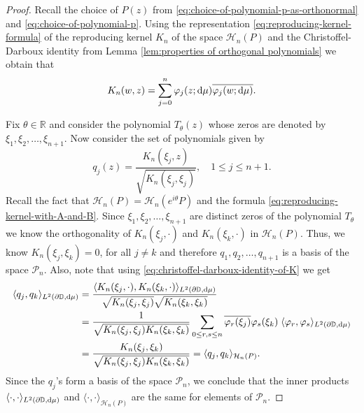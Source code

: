\documentclass[reqno, a4paper]{amsart}
\def\R{\mathbb{R}}
\def\P{\mathcal{P}}
\renewcommand{\d}{\text{\rm d}}
\newcommand{\dD}{\partial\mathbb{D}}
\theoremstyle{plain}
\theoremstyle{definition}
\theoremstyle{remarkstyle}
\numberwithin{equation}{section}
\begin{document}
\begin{proof}
Recall the choice of $P(z)$ from \eqref{eq:choice-of-polynomial-p-as-orthonormal} and \eqref{eq:choice-of-polynomial-p}. Using the representation \eqref{eq:reproducing-kernel-formula} of the reproducing kernel $K_n$ of the space $\mathcal{H}_n(P)$ and the Christoffel-Darboux identity from Lemma \ref{lem:properties of orthogonal polynomials} we obtain that 
\begin{equation}\label{eq:christoffel-darboux-identity-of-K}
    K_n(w, z)=\sum_{j=0}^n \varphi_j(z;\d\mu)\overline{\varphi_j(w; \d\mu)}.
\end{equation}

Fix $\theta\in \R$ and consider the polynomial $T_\theta(z)$ whose zeros are denoted by $\xi_1, \xi_2, \ldots, \xi_{n+1}$. Now consider the set of polynomials given by 
\begin{equation*}
    q_j(z)=\frac{K_n(\xi_j, z)}{\sqrt{K_n(\xi_j, \xi_j)}}, \quad 1\leq j\leq n+1.
\end{equation*} 
Recall the fact that $\mathcal{H}_n(P)=\mathcal{H}_n(e^{i\theta}P)$ and the formula \eqref{eq:reproducing-kernel-with-A-and-B}. Since $\xi_1, \xi_2, \ldots, \xi_{n+1}$ are distinct zeros of the polynomial $T_\theta$ we know the orthogonality of $K_n(\xi_j, \cdot)$ and $K_n(\xi_k, \cdot)$ in $\mathcal{H}_n(P)$.  Thus, we know $K_n(\xi_j, \xi_k)=0$, for all $j\neq k$ and therefore $q_1, q_2, \ldots, q_{n+1}$ is a basis of the space $\mathcal{P}_n$. Also, note that using \eqref{eq:christoffel-darboux-identity-of-K} we get 
\begin{equation*}
    \begin{split}
        \langle q_j, q_k\rangle_{L^2(\dD, \d\mu)}&=\frac{\langle K_n(\xi_j, \cdot), K_n(\xi_k, \cdot)\rangle_{L^2(\dD, \d\mu)}}{\sqrt{K_n(\xi_j, \xi_j)}\sqrt{ K_n(\xi_k, \xi_k)}}\\
        &=\frac{1}{\sqrt{K_n(\xi_j, \xi_j) K_n(\xi_k, \xi_k)}}\sum_{0\leq r, s\leq n}\overline{\varphi_r(\xi_j)}\varphi_s(\xi_k)\; \langle \varphi_r, \varphi_s\rangle_{L^2(\dD, \d\mu)}\\
        &=\frac{K_n(\xi_j, \xi_k)}{\sqrt{K_n(\xi_j, \xi_j) K_n(\xi_k, \xi_k)}}=\langle q_j, q_k\rangle_{\mathcal{H}_n(P)}.
    \end{split}
\end{equation*}
Since the $q_j$'s form a basis of the space $\P_n$, we conclude that the inner products $\langle \cdot , \cdot \rangle_{L^2(\dD, \d\mu)}$  and $\langle \cdot, \cdot \rangle_{\mathcal{H}_n(P)}$ are the same for elements of $\P_n$. 
\medskip


\end{proof}
\end{document}
